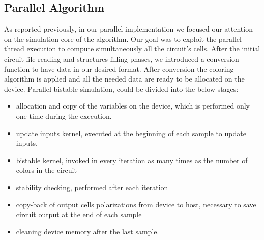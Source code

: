 \subsection{Parallel Algorithm}
As reported previously, in our parallel implementation we focused our attention on the simulation core of the algorithm.\newline
Our goal was to exploit the parallel thread execution to compute simultaneously all the circuit's cells. 
After the initial circuit file reading and structures filling phases, we introduced a conversion function to have data in our desired format.
After conversion the coloring algorithm is applied and all the needed data are ready to be allocated on the device.\newline
Parallel bistable simulation, could be divided into the below stages:
\begin{itemize}
 \item allocation and copy of the variables on the device, which is performed only one time during the execution.
 \item update inputs kernel, executed at the beginning of each sample to update inputs.
 \item bistable kernel, invoked in every iteration as many times as the number of colors in the circuit
 \item stability checking, performed after each iteration
 \item copy-back of output cells polarizations from device to host, necessary to save circuit output at the end of each sample
 \item cleaning device memory after the last sample.
\end{itemize}





